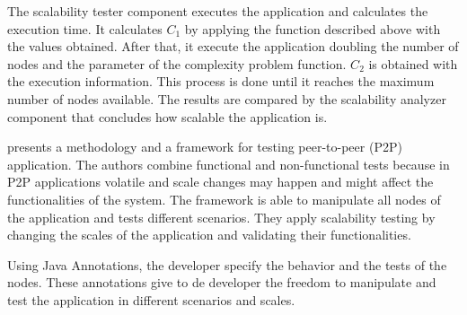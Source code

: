 The scalability tester component executes the application and calculates the execution time.  It calculates $C_1$ by applying the function described above with the values obtained. After that, it execute the application doubling the number of nodes and the parameter of the complexity problem function. $C_2$ is obtained with the execution information. This process is done until it reaches the maximum number of nodes available. The results are compared by the scalability analyzer component that concludes how scalable the application is.

\cite{p2p} presents a methodology and a framework for testing peer-to-peer (P2P) application. The authors combine functional and non-functional tests because in P2P applications volatile and scale changes may happen and might affect the functionalities of the system. The framework is able to manipulate all nodes of the application and tests different scenarios. They apply scalability testing by changing the scales of the application and validating their functionalities. 

Using Java Annotations, the developer specify the behavior and the tests of the nodes. These annotations give to de developer the freedom to manipulate and test the application in different scenarios and scales.










